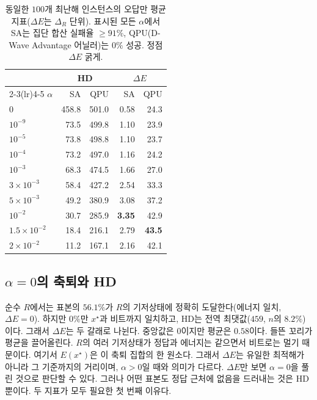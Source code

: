 \documentclass[10pt, conference]{IEEEtran}
\begin{document}
\begin{table}[!t]
\centering
\caption{동일한 $100$개 최난해 인스턴스의 오답만 평균 지표($\Delta E$는
$\Delta_R$ 단위). 표시된 모든 $\alpha$에서 SA는 집단 합산 실패율 $\geq91\%$,
QPU(D-Wave Advantage 어닐러)는 $0\%$ 성공. 정점 $\Delta E$ 굵게.}
\label{tab:metrics}
\footnotesize
\setlength{\tabcolsep}{5pt}
\renewcommand{\arraystretch}{1.0}
\begin{tabular}{lrrrr}
\toprule
 & \multicolumn{2}{c}{HD} & \multicolumn{2}{c}{$\Delta E$} \\
\cmidrule(lr){2-3}\cmidrule(lr){4-5}
$\alpha$ & SA & QPU & SA & QPU \\
\midrule
$0$               & 458.8 & 501.0 & 0.58 & 24.3 \\
$10^{-9}$         &  73.5 & 499.8 & 1.10 & 23.9 \\
$10^{-5}$         &  73.8 & 498.8 & 1.10 & 23.7 \\
$10^{-4}$         &  73.2 & 497.0 & 1.16 & 24.2 \\
$10^{-3}$         &  68.3 & 474.5 & 1.66 & 27.0 \\
$3\times10^{-3}$  &  58.4 & 427.2 & 2.54 & 33.3 \\
$5\times10^{-3}$  &  49.2 & 380.9 & 3.08 & 37.2 \\
$10^{-2}$         &  30.7 & 285.9 & \textbf{3.35} & 42.9 \\
$1.5\times10^{-2}$ & 18.4 & 216.1 & 2.79 & \textbf{43.5} \\
$2\times10^{-2}$  &  11.2 & 167.1 & 2.16 & 42.1 \\
\bottomrule
\end{tabular}
\end{table}

\subsection{$\alpha{=}0$의 축퇴와 HD}
순수 $R$에서는 표본의 $56.1\%$가 $R$의 기저상태에 정확히 도달한다(에너지 일치,
$\Delta E{=}0$). 하지만 $0\%$만 $x^\star$과 비트까지 일치하고, HD는 전역
최댓값($459$, $n$의 $8.2\%$)이다. 그래서 $\Delta E$는 두 갈래로 나뉜다. 중앙값은
$0$이지만 평균은 $0.58$이다. 들뜬 꼬리가 평균을 끌어올린다. $R$의 여러 기저상태가
정답과 에너지는 같으면서 비트로는 멀기 때문이다. 여기서 $E(x^\star)$은 이 축퇴
집합의 한 원소다. 그래서 $\Delta E$는 유일한 최적해가 아니라 그 기준까지의
거리이며, $\alpha{>}0$일 때와 의미가 다르다. $\Delta E$만 보면 $\alpha{=}0$을
풀린 것으로 판단할 수 있다. 그러나 어떤 표본도 정답 근처에 없음을 드러내는 것은
HD뿐이다. 두 지표가 모두 필요한 첫 번째 이유다.
\end{document}
